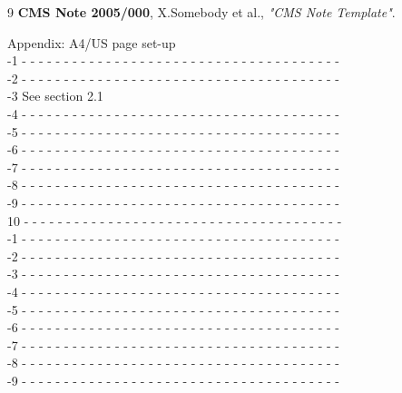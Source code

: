 \begin{thebibliography}{9}
   {\bf CMS Note 2005/000},
    X.Somebody et al.,
    {\em "CMS Note Template"}.
\end{thebibliography}
\pagebreak
{\small \begin{flushleft}
Appendix: A4/US page set-up\\
-1 - - - - - - - - - - - - - - - - - - - - - - - - - - - - - - - - - - - - - -\\
-2 - - - - - - - - - - - - - - - - - - - - - - - - - - - - - - - - - - - - - -\\
-3		See section 2.1\\
-4 - - - - - - - - - - - - - - - - - - - - - - - - - - - - - - - - - - - - - -\\
-5 - - - - - - - - - - - - - - - - - - - - - - - - - - - - - - - - - - - - - -\\
-6 - - - - - - - - - - - - - - - - - - - - - - - - - - - - - - - - - - - - - -\\
-7 - - - - - - - - - - - - - - - - - - - - - - - - - - - - - - - - - - - - - -\\
-8 - - - - - - - - - - - - - - - - - - - - - - - - - - - - - - - - - - - - - -\\
-9 - - - - - - - - - - - - - - - - - - - - - - - - - - - - - - - - - - - - - -\\
10 - - - - - - - - - - - - - - - - - - - - - - - - - - - - - - - - - - - - - -\\
-1 - - - - - - - - - - - - - - - - - - - - - - - - - - - - - - - - - - - - - -\\
-2 - - - - - - - - - - - - - - - - - - - - - - - - - - - - - - - - - - - - - -\\
-3 - - - - - - - - - - - - - - - - - - - - - - - - - - - - - - - - - - - - - -\\
-4 - - - - - - - - - - - - - - - - - - - - - - - - - - - - - - - - - - - - - -\\
-5 - - - - - - - - - - - - - - - - - - - - - - - - - - - - - - - - - - - - - -\\
-6 - - - - - - - - - - - - - - - - - - - - - - - - - - - - - - - - - - - - - -\\
-7 - - - - - - - - - - - - - - - - - - - - - - - - - - - - - - - - - - - - - -\\
-8 - - - - - - - - - - - - - - - - - - - - - - - - - - - - - - - - - - - - - -\\
-9 - - - - - - - - - - - - - - - - - - - - - - - - - - - - - - - - - - - - - -\\

\end{flushleft}}
